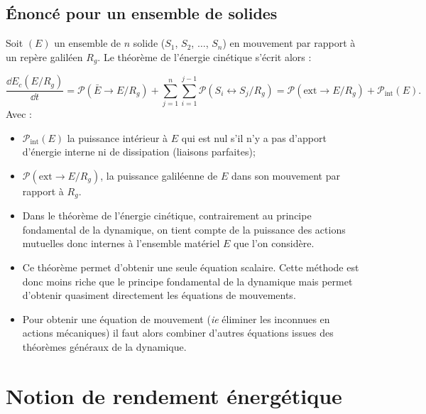 \documentclass[10pt,fleqn]{article} %
\begin{document}
\subsection{Énoncé pour un ensemble de solides}

\begin{theorem}
Soit $(E)$ un ensemble de $n$ solide ($S_1$, $S_2$, $\ldots$, $S_n$) en mouvement par rapport à un repère galiléen $R_g$. Le théorème de l'énergie cinétique s'écrit alors :

$$
\frac{\dd E_c(E/R_g)}{\dd t}=\mathcal{P}(\bar E \rightarrow E/R_g)+ \displaystyle{\sum^n_{j=1}}\displaystyle{\sum^{j-1}_{i=1}}\mathcal{P}(S_i \leftrightarrow S_j/R_g)=\mathcal{P}(\text{ext}\rightarrow E/R_g)+\mathcal{P}_{\text{int}}(E).
$$
Avec :
\begin{itemize}
\item $\mathcal{P}_{\text{int}}(E)$ la puissance intérieur à $E$ qui est nul s'il n'y a pas d'apport d'énergie interne ni de dissipation (liaisons parfaites);
\item $\mathcal{P}(\text{ext}\rightarrow E/R_g)$, la puissance galiléenne de $E$ dans son mouvement par rapport à $R_g$.
\end{itemize}

\end{theorem}

\begin{rem}%
\begin{itemize}
\item Dans le théorème de l'énergie cinétique, contrairement au principe fondamental de la dynamique, on tient compte de la puissance des actions mutuelles donc internes à l'ensemble matériel $E$ que l'on considère.
\item Ce théorème permet d'obtenir une seule équation scalaire. Cette méthode est donc moins riche que le principe fondamental de la dynamique mais permet d'obtenir quasiment directement les équations de mouvements.
\item Pour obtenir une équation de mouvement (\textit{ie} éliminer les inconnues en actions mécaniques) il faut alors combiner d'autres équations issues des théorèmes généraux de la dynamique.
\end{itemize}
\end{rem}%


\section{Notion de rendement énergétique}
\end{document}
